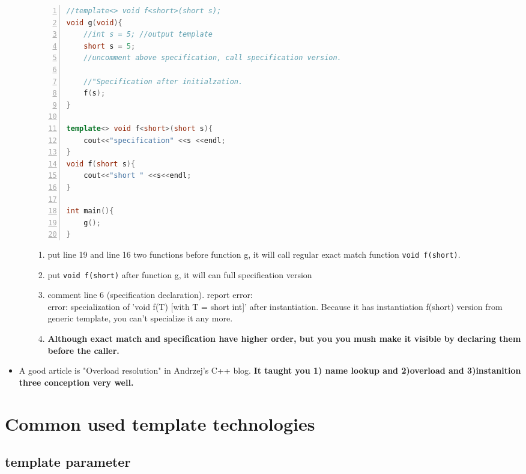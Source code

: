\documentclass[a4paper,11pt,twoside]{book}
\begin{document}
\begin{itemize}
\begin{enumerate}
\begin{lstlisting}[frame=single, language=c++, numbers=left,
stepnumber=1,]
//template<> void f<short>(short s);
void g(void){
	//int s = 5; //output template
	short s = 5; 
	//uncomment above specification, call specification version.

	//"Specification after initialzation.
	f(s);
}

template<> void f<short>(short s){
	cout<<"specification" <<s <<endl;
}
void f(short s){
	cout<<"short " <<s<<endl;
}

int main(){
	g();
}
\end{lstlisting}

\begin{enumerate}
	\item put line 19 and line 16 two functions before function g, it will call regular exact match function \texttt{void f(short)}. 
	
	\item put \texttt{void f(short)} after function g, it will can full specification version
	
	\item comment line 6 (specification declaration). report error:\\
	error: specialization of 'void f(T) [with T = short int]' after instantiation.
	Because it has instantiation f(short) version from generic template, you can't specialize it any more.
	 
	\item \textbf{Although exact match and specification have higher order, but you you mush make it visible by declaring them before the caller.}
\end{enumerate}

\end{enumerate}

    \item A good article is "Overload resolution" in Andrzej's C++ blog. \textbf{It taught you 1) name lookup and 2)overload and 3)instanition three conception very well.}
\end{itemize}


\section{Common used template technologies}

\subsection{template parameter}
\end{document}
